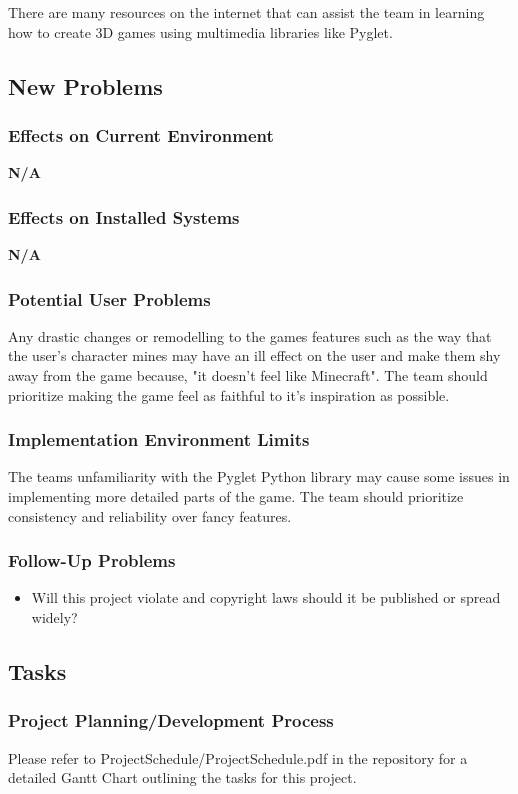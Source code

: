 \documentclass[12pt, titlepage]{article}
\begin{document}
There are many resources on the internet that can assist the team in learning how to create 3D games using multimedia libraries like Pyglet.


\subsection{New Problems}
\subsubsection{Effects on Current Environment}
\textbf{N/A}

\subsubsection{Effects on Installed Systems}
\textbf{N/A}

\subsubsection{Potential User Problems}
Any drastic changes or remodelling to the games features such as the way that the user's character mines may have an ill effect on the user and make them shy away from the game because, "it doesn't feel like Minecraft". The team should prioritize making the game feel as faithful to it's inspiration as possible.

\subsubsection{Implementation Environment Limits}
The teams unfamiliarity with the Pyglet Python library may cause some issues in implementing more detailed parts of the game. The team should prioritize consistency and reliability over fancy features.

\subsubsection{Follow-Up Problems}
\begin{itemize}
    \item Will this project violate and copyright laws should it be published or spread widely?
\end{itemize}

\subsection{Tasks}
\subsubsection{Project Planning/Development Process}
Please refer to ProjectSchedule/ProjectSchedule.pdf in the repository for a detailed Gantt Chart outlining the tasks for this project.
\end{document}
